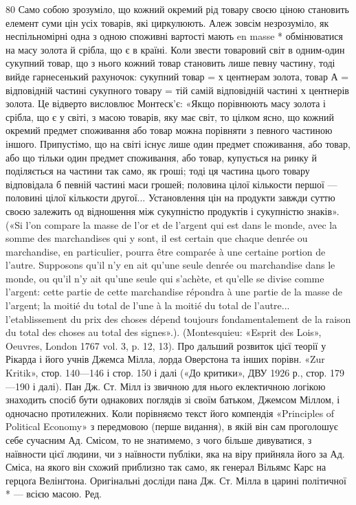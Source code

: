 80    Само собою зрозуміло, що кожний окремий рід товару своєю ціною
становить елемент суми цін усіх товарів, які циркулюють. Алеж зовсім
незрозуміло, як неспільномірні одна з одною споживні вартості мають
en masse * обмінюватися на масу золота й срібла, що є в країні. Коли
звести товаровий світ в одним-один сукупний товар, що з нього кожний
товар становить лише певну частину, тоді вийде гарнесенький рахуночок:
сукупний товар = х центнерам золота, товар А = відповідній частині
сукупного товару = тій самій відповідній частині х центнерів золота. Це
відверто висловлює Монтеск’є: «Якщо порівнюють масу золота і срібла,
що є у світі, з масою товарів, яку має світ, то цілком ясно, що кожний
окремий предмет споживання або товар можна порівняти з певного частиною
іншого. Припустімо, що на світі існує лише один предмет споживання,
або товар, або що тільки один предмет споживання, або товар, купується
на ринку й поділяється на частини так само, як гроші; тоді ця частина
цього товару відповідала б певній частині маси грошей; половина цілої
кількости першої — половині цілої кількости другої... Установлення цін
на продукти завжди суттю своєю залежить од відношення між сукупністю
продуктів і сукупністю знаків». («Si l’on compare la masse de l’or et
de l’argent qui est dans le monde, avec la somme des marchandises qui y
sont, il est certain que chaque denrée ou marchandise, en particulier, pourra
être comparée à une certaine portion de l’autre. Supposons qu’il n’y en ait
qu’une seule denrée ou marchandise dans le monde, ou qu’il n’y ait qu’une
seule qui s’achète, et qu’elle se divise comme l’argent: cette partie de cette marchandise
répondra à une partie de la masse de l’argent; la moitié du total
de l’une à la moitié du total de l’autre... l’etablissement du prix des choses
dépend toujours fondamentalement de la raison du total des choses au
total des signes».). (Montesquieu: «Esprit des Lois», Oeuvres, London
1767 vol. 3, p. 12, 13). Про дальший розвиток цієї теорії у Рікарда
і його учнів Джемса Мілла, лорда Оверстона та інших порівн. «Zur
Kritik», стор. 140—146 і стор. 150 і далі («До критики», ДВУ 1926 р.,
стор. 179—190 і далі). Пан Дж. Ст. Мілл із звичною для нього еклектичною
логікою знаходить спосіб бути однакових поглядів зі своїм
батьком, Джемсом Міллом, і одночасно протилежних. Коли порівняємо
текст його компендія «Principles of Political Economy» з передмовою
(перше видання), в якій він сам проголошує себе сучасним Ад. Смісом,
то не знатимемо, з чого більше дивуватися, з наївности цієї людини, чи
з наївности публіки, яка на віру прийняла його за Ад. Сміса, на якого
він схожий приблизно так само, як генерал Вільямс Карс на герцоґа
Велінґтона. Оригінальні досліди пана Дж. Ст. Мілла в царині політичної
* — всією масою. Ред.
